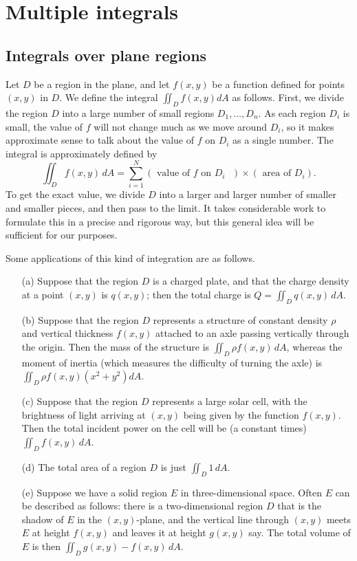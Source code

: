 \documentclass[reqno]{amsart}
\theoremstyle{definition}
\begin{document}
\section{Multiple integrals}

\subsection{Integrals over plane regions}
\label{subsec-plane-integrals}

Let $D$ be a region in the plane, and let $f(x,y)$ be a function
defined for points $(x,y)$ in $D$.  We define the integral 
$\iint_D f(x,y)dA$ as follows.  First, we divide the region $D$
into a large number of small regions $D_1,\dotsc,D_n$.  As each region
$D_i$ is small, the value of $f$ will not change much as we move
around $D_i$, so it makes approximate sense to talk about the value of
$f$ on $D_i$ as a single number.  The integral is approximately
defined by 
\[ \iint_D f(x,y)\,dA = \sum_{i=1}^N 
    (\text{ value of $f$ on $D_i$ }) \times (\text{ area of } D_i).
\]
To get the exact value, we divide $D$ into a larger and larger number
of smaller and smaller pieces, and then pass to the limit.  It takes
considerable work to formulate this in a precise and rigorous way, but
this general idea will be sufficient for our purposes.

Some applications of this kind of integration are as follows.
\begin{itemize}
 \item[(a)] Suppose that the region $D$ is a charged plate, and that
  the charge density at a point $(x,y)$ is $q(x,y)$; then the total
  charge is $Q=\iint_Dq(x,y)\,dA$.
 \item[(b)] Suppose that the region $D$ represents a structure of
  constant density $\rho$ and vertical thickness $f(x,y)$ attached to
  an axle passing vertically through the origin.  Then the mass of the
  structure is $\iint_D\rho f(x,y)\,dA$, whereas the moment of
  inertia (which measures the difficulty of turning the axle) is
  $\iint_D\rho f(x,y)(x^2+y^2)dA$.
 \item[(c)] Suppose that the region $D$ represents a large solar cell,
  with the brightness of light arriving at $(x,y)$ being given by the
  function $f(x,y)$.  Then the total incident power on the cell will
  be (a constant times) $\iint_Df(x,y)\,dA$.  
 \item[(d)] The total area of a region $D$ is just $\iint_D 1\,dA$.
 \item[(e)] Suppose we have a solid region $E$ in three-dimensional
  space.  Often $E$ can be described as follows: there is a
  two-dimensional region $D$ that is the shadow of $E$ in the
  $(x,y)$-plane, and the vertical line through $(x,y)$ meets $E$ at
  height $f(x,y)$ and leaves it at height $g(x,y)$ say.  The total
  volume of $E$ is then $\iint_D g(x,y)-f(x,y)\,dA$.
\end{itemize}
\end{document}
